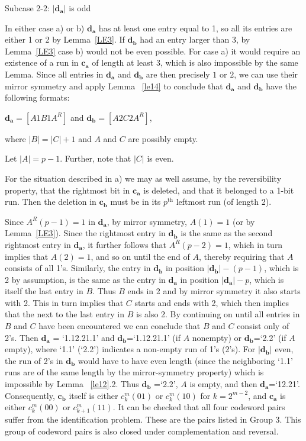 Subcase 2-2: $|\mathbf{d_a}|$ is odd

In either case a) or b) $\mathbf{d_a}$ has at least one entry
equal to 1, so all its entries are either 1 or 2 by
Lemma~\ref{LE3}. If $\mathbf{d_b}$ had an entry larger than 3, by
Lemma~\ref{LE3} case b) would not be even possible. For case a) it
would require an existence of a run in $\mathbf{c_a}$ of length at
least 3, which is also impossible by the same Lemma. Since all
entries in $\mathbf{d_a}$ and $\mathbf{d_b}$ are then precisely
$1$ or $2$, we can use their mirror symmetry and apply Lemma
~\ref{le14} to conclude that $\mathbf{d_a}$ and $\mathbf{d_b}$
have the following formats:

$\mathbf{d_a}=[A1B1A^R]$ and $\mathbf{d_b}=[A2C2A^R]$,

where $|B|=|C|+1$ and $A$ and $C$ are possibly empty.

Let $|A|=p-1$. Further, note that $|C|$ is even.

For the situation described in a) we may as well assume, by the
reversibility property, that the rightmost bit in $\mathbf{c_a}$
is deleted, and that it belonged to a 1-bit run. Then the deletion
in $\mathbf{c_b}$ must be in its $p^{\text{th}}$ leftmost run (of
length 2).

Since $A^R(p-1)=1$ in $\mathbf{d_a}$, by mirror symmetry, $A(1)=1$
(or by Lemma~\ref{LE3}). Since the rightmost entry in
$\mathbf{d_b}$ is the same as the second rightmost entry in
$\mathbf{d_a}$, it further follows that $A^R(p-2)=1$, which in
turn implies that $A(2)=1$, and so on until the end of $A$,
thereby requiring that $A$ consists of all 1's. Similarly, the
entry in $\mathbf{d_b}$ in position $|\mathbf{d_b}|-(p-1)$, which
is 2 by assumption, is the same as the entry in $\mathbf{d_a}$ in
position $|\mathbf{d_a}|-p$, which is itself the last entry in
$B$. Thus $B$ ends in 2 and by mirror symmetry it also starts with
2. This in turn implies that $C$ starts and ends with 2, which
then implies that the next to the last entry in $B$ is also 2. By
continuing on until all entries in $B$ and $C$ have been
encountered we can conclude that $B$ and $C$ consist only of 2's.
Then $\mathbf{d_a}$ = `1.12.21.1' and $\mathbf{d_b}$=`1.12.21.1'
(if $A$ nonempty) or $\mathbf{d_b}$=`2.2' (if $A$ empty), where
`1.1' (`2.2') indicates a non-empty run of 1's (2's). For
$|\mathbf{d_b}|$ even, the run of 2's in $\mathbf{d_b}$ would have
to have even length (since the neighboring `1.1' runs are of the
same length by the mirror-symmetry property) which is impossible
by Lemma ~\ref{le12}.2. Thus $\mathbf{d_b}$ =`2.2', $A$ is empty,
and then $\mathbf{d_a}$=`12.21'. Consequently, $\mathbf{c_b}$
itself is either $c_k^m(01)$ or $c_k^m(10)$ for $k=2^{m-2}$, and
$\mathbf{c_a}$ is either $c_k^m(00)$ or $c_{k+1}^m(11)$. It can be
checked that all four codeword pairs suffer from the
identification problem. These are the pairs listed in Group 3.
This group of codeword pairs is also closed under complementation
and reversal.

